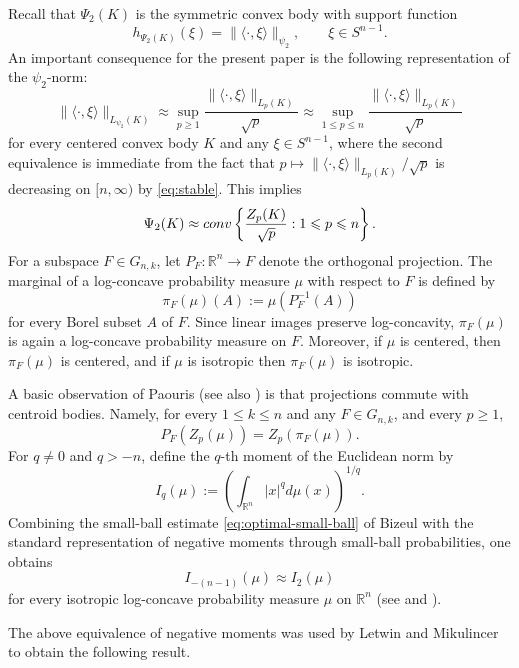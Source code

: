 \documentclass[10pt,a4paper]{amsart}
\numberwithin{equation}{section}
\newcommand{\ls}{\leqslant}
\newcommand{\gr}{\geqslant}
\begin{document}
Recall that $\Psi_2(K)$ is the symmetric convex body with support function
\[ h_{\Psi_2(K)}(\xi)=\|\langle \cdot,\xi\rangle\|_{\psi_2},\qquad \xi\in S^{n-1}.\]
An important consequence for the present paper is the following representation of the $\psi_2$-norm:
\[\|\langle \cdot ,\xi\rangle\|_{L_{\psi_2}(K)}\approx\sup_{p\gr1}\frac{\|\langle \cdot ,\xi\rangle\|_{L_p(K)}}{\sqrt p}\approx
\sup_{1\ls p\ls n}\frac{\|\langle \cdot ,\xi\rangle\|_{L_p(K)}}{\sqrt p}\]
for every centered convex body $K$ and any $\xi\in S^{n-1}$, where the second equivalence is immediate from 
the fact that $p\mapsto \|\langle \cdot ,\xi\rangle\|_{L_p(K)}/\sqrt p$ is decreasing on $[n,\infty)$ by \eqref{eq:stable}. This implies
\begin{equation}\label{eq:convex-hull}\Psi_2(K )\approx{\rm conv}\left\{\frac{Z_p(K)}{\sqrt{p}}: 1\ls p\ls n\right\}.\end{equation} 
For a subspace $F \in G_{n,k}$, let $P_F:\mathbb{R}^n\to F$ denote the orthogonal projection. The marginal of a log-concave probability
measure $\mu$ with respect to $F$ is defined by
\begin{equation*}\pi_F(\mu)(A):=\mu(P_F^{-1}(A))
\end{equation*}for every Borel subset $A$ of $F$. Since linear images preserve log-concavity, $\pi_F(\mu)$ is again a log-concave probability
measure on $F$. Moreover, if $\mu$ is centered, then $\pi_F(\mu)$ is centered, and if $\mu$ is isotropic then
$\pi_F(\mu)$ is isotropic.

A basic observation of Paouris \cite{Paouris-GAFA} (see also \cite[Theorem~5.1.12]{BGVV-book}) is that projections commute with centroid bodies. Namely, 
for every $1\ls k\ls n$ and any $F \in G_{n,k}$, and every $p\gr 1$,
\begin{equation}\label{eq:marginal-Zq}
P_F(Z_p(\mu)) = Z_p(\pi_F(\mu)).
\end{equation}
For $q\neq 0$ and $q>-n$, define the $q$-th moment of the Euclidean norm by
\[I_q(\mu ):=\left( \int_{\mathbb{R}^n} |x|^q d\mu (x)\right)^{1/q}.\]
Combining the small-ball estimate \eqref{eq:optimal-small-ball} of 
Bizeul \cite{Bizeul-2025} with the standard representation of negative moments through small-ball probabilities, one obtains
\[I_{-(n-1)}(\mu)\approx I_2(\mu)\] 
for every isotropic log-concave probability measure $\mu$ on $\mathbb{R}^n$ (see \cite{Dafnis-Paouris-2010} and \cite[Theorem~6.9]{Giannopoulos-Pafis-Tziotziou-2025}).

The above equivalence of negative moments was used by Letwin and
Mikulincer \cite[Proposition~2.4]{Letwin-Mikulincer-2026} to obtain the following result.
\end{document}
